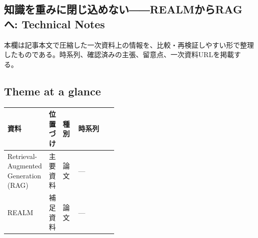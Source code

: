 \subsection*{知識を重みに閉じ込めない――REALMからRAGへ: Technical Notes}
本欄は記事本文で圧縮した一次資料上の情報を、比較・再検証しやすい形で整理したものである。時系列、確認済みの主張、留意点、一次資料URLを掲載する。
\medskip
\subsection*{Theme at a glance}
\begin{center}
\footnotesize
\begin{tabularx}{\linewidth}{@{}p{0.20\linewidth}p{0.10\linewidth}p{0.14\linewidth}X@{}}
\toprule
資料 & 位置づけ & 種別 & 時系列 \\
\midrule
Retrieval-Augmented Generation (RAG) & 主要資料 & 論文 & — \\
REALM & 補足資料 & 論文 & — \\
\bottomrule
\end{tabularx}
\end{center}
\normalsize

